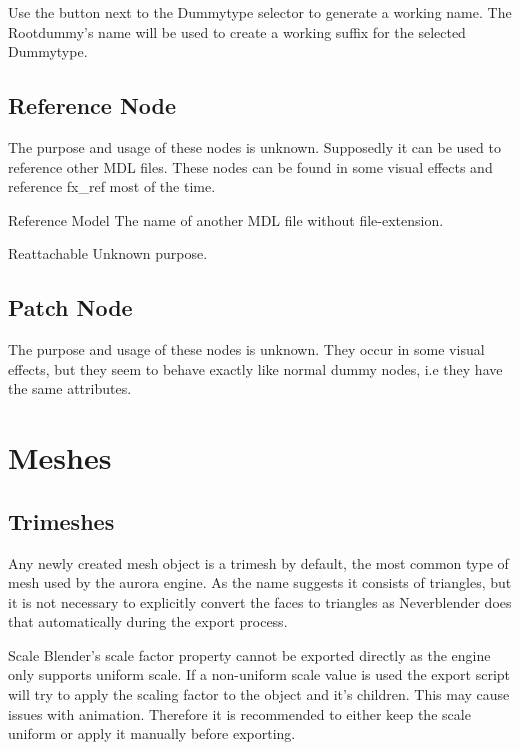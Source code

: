 Use the button next to the Dummytype selector to generate a
working name. The Rootdummy's name will be used to create a working
suffix for the selected Dummytype. \\

\subsection{Reference Node}
The purpose and usage of these nodes is unknown. Supposedly it can be used to
reference other MDL files. These nodes can be found in some visual effects and reference fx\_ref 
most of the time.

\begin{propertyAurora}{Reference Model}
The name of another MDL file without file-extension.
\end{propertyAurora}

\begin{propertyAurora}{Reattachable}
Unknown purpose.
\end{propertyAurora}

\subsection{Patch Node}
The purpose and usage of these nodes is unknown. They occur in some visual effects, but
they seem to behave exactly like normal dummy nodes, i.e they have the same
attributes.

\section{Meshes}

\subsection{Trimeshes}
Any newly created mesh object is a trimesh by default, the most common type of mesh 
used by the aurora engine. As the name suggests it consists of triangles, but it is 
not necessary to explicitly convert the faces to triangles as Neverblender does that 
automatically during the export process.

\begin{propertyBlender}{Scale}
Blender's scale factor property cannot be exported directly as the engine 
only supports uniform scale. If a non-uniform scale value is used the export 
script will try to apply the scaling factor to the object and it's children.
This may cause issues with animation. Therefore it is recommended to either keep 
the scale uniform or apply it manually before exporting.
\end{propertyBlender}  
 
